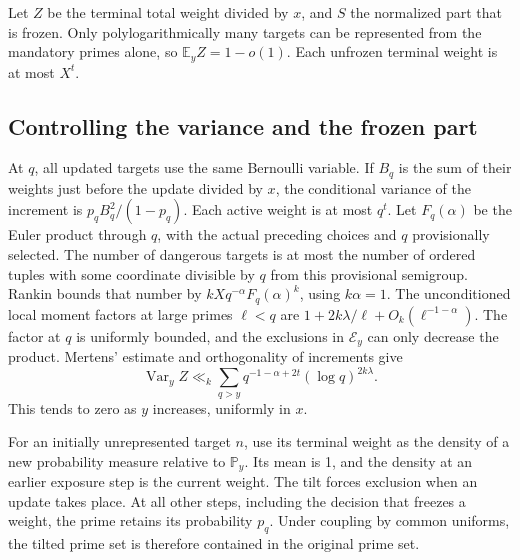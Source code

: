 \documentclass[11pt]{article}
\newcommand{\E}{\mathbb E}
\newcommand{\PP}{\mathbb P}
\newcommand{\Var}{\operatorname{Var}}
\begin{document}
Let \(Z\) be the terminal total weight divided by \(x\), and
\(S\) the normalized part that is frozen. Only polylogarithmically
many targets can be represented from the mandatory primes alone,
so \(\E_y Z=1-o(1)\). Each unfrozen terminal weight is at most
\(X^t\).

\subsection{Controlling the variance and the frozen part}

At \(q\), all updated targets use the same Bernoulli variable.
If \(B_q\) is the sum of their weights just before the update
divided by \(x\), the conditional variance of the increment is
\(p_q B_q^2/(1-p_q)\). Each active weight is at most \(q^t\).
Let \(F_q(\alpha)\) be the Euler product through \(q\), with the
actual preceding choices and \(q\) provisionally selected.
The number of dangerous targets is at most the number of
ordered tuples with some coordinate divisible by \(q\) from this
provisional semigroup. Rankin bounds that number by
\(kX q^{-\alpha}F_q(\alpha)^k\), using \(k\alpha=1\).
The unconditioned local moment factors at large primes
\(\ell<q\) are
\(1+2k\lambda/\ell+O_k(\ell^{-1-\alpha})\). The factor at \(q\)
is uniformly bounded, and the exclusions in \(\mathcal E_y\)
can only decrease the product. Mertens' estimate and
orthogonality of increments give
\begin{equation}\label{eq:variance}
        \Var_y Z\ll_k
        \sum_{q>y}q^{-1-\alpha+2t}(\log q)^{2k\lambda}.
\end{equation}
This tends to zero as \(y\) increases, uniformly in \(x\).

For an initially unrepresented target \(n\), use its terminal
weight as the density of a new probability measure relative to
\(\PP_y\). Its mean is 1, and the density at an earlier exposure
step is the current weight. The tilt forces exclusion when an
update takes place. At all other steps, including the decision
that freezes a weight, the prime retains its probability \(p_q\).
Under coupling by common uniforms, the tilted prime set is
therefore contained in the original prime set.
\end{document}
